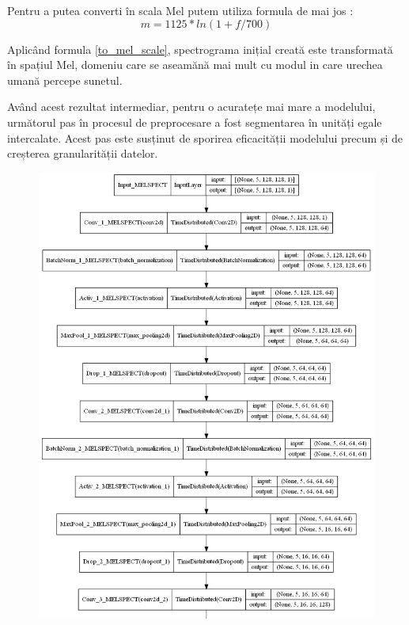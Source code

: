 \documentclass[a4paper, 12pt]{report}
\begin{document}
	Pentru a putea converti în scala Mel putem utiliza formula de mai jos :
	\begin{equation}
	\label{to_mel_scale}
		m=1125 * ln(1+f/700)
	\end{equation}
	
	Aplicând formula \ref{to_mel_scale}, spectrograma inițial creată este transformată în spațiul Mel, domeniu care se aseamănă mai mult cu modul in care urechea umană percepe sunetul.
	
	Având acest rezultat intermediar, pentru o acuratețe mai mare a modelului, următorul pas în procesul de preprocesare a fost segmentarea în unități egale intercalate. Acest pas este susținut de sporirea eficacității modelului precum și de creșterea granularității datelor.
	
	\begin{figure}[H]
		\begin{center}
			\includegraphics[width=\textwidth,height=\textheight,keepaspectratio]{images/audio_model_001.jpg}
		\end{center}
	\end{figure}
\end{document}
